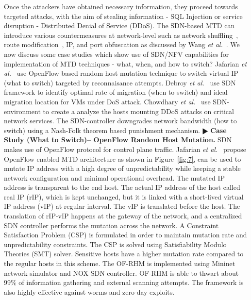 Once the attackers have obtained necessary information, they proceed towards targeted attacks, with the aim of stealing information - SQL Injection or service disruption - Distributed Denial of Service (DDoS). The SDN-based MTD can introduce various countermeasures at network-level such as network shuffling~, route modification~, IP, and port obfuscation as discussed by Wang \textit{et al.}~.
We now discuss some case studies which show use of SDN/NFV capabilities for implementation of MTD techniques - what, when, and how to switch? Jafarian \textit{et al.}~ use OpenFlow based random host mutation technique to switch virtual IP (what to switch) targeted by reconnaisance attempts. Debroy \textit{et al.}~ use SDN framework to identify optimal rate of migration (when to switch) and ideal migration location for VMs under DoS attack. Chowdhary \textit{et al.}~ use SDN-environment to create a analyze the hosts mounting DDoS attacks on critical network services. The SDN-controller downgrades network bandwidth (how to switch) using a Nash-Folk theorem based punishment mechanism. 
\noindent $\RHD$ \textbf{Case Study (What to Switch)-- OpenFlow Random Host Mutation.}
SDN makes use of OpenFlow protocol for control plane traffic. Jafarian \textit{et al.}~ propose OpenFlow enabled MTD architecture as shown in Figure~\ref{fig:7}, can be used to mutate IP address with a high degree of unpredictability while keeping a stable network configuration and minimal operational overhead.
The mutated IP address is transparent to the end host. The actual IP address of the host called real IP (rIP), which is kept unchanged, but it is linked with a short-lived virtual IP address (vIP) at regular interval. The vIP is translated before the host. The translation of rIP-vIP happens at the gateway of the network, and a centralized SDN controller performs the mutation across the network. A Constraint Satisfaction Problem (CSP) is formulated in order to maintain mutation rate and unpredictability constraints. The CSP is solved using Satisfiability Modulo Theories (SMT) solver.
Sensitive hosts have a higher mutation rate compared to the regular hosts in this scheme. The OF-RHM is implemented using Mininet network simulator and NOX SDN controller. OF-RHM is able to thwart about 99\% of information gathering and external scanning attempts. The framework is also highly effective against worms and zero-day exploits.
